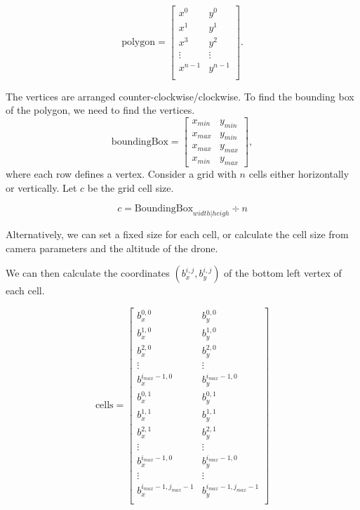 \begin{figure}
	
	\label{fig:viewpoint-generation}
\end{figure}

$$
\text{polygon} = \begin{bmatrix}
x^0 & y^0 \\
x^1 & y^1 \\
x^3 & y^2 \\
\vdots  & \vdots \\
x^{n-1} & y^{n-1} \\
\end{bmatrix}. 
$$

The vertices are arranged counter-clockwise/clockwise. To find the bounding box of the polygon, we need to find the vertices.
$$
\text{boundingBox} = \begin{bmatrix}
x_{min} & y_{min} \\
x_{max} & y_{min} \\
x_{max} & y_{max} \\
x_{min} & y_{max}
\end{bmatrix},
$$
where each row defines a vertex. Consider a grid with $n$ cells either horizontally or vertically. Let $c$ be the grid cell size.

$$c = \text{BoundingBox}_{width|heigh} \div  n $$

Alternatively, we can set a fixed size for each cell, or calculate the cell size from camera parameters and the altitude of the drone.

We can then calculate the coordinates $(b^{i,j}_x, b^{i,j}_y)$ of the bottom left vertex of each cell.

$$\text{cells} =\begin{bmatrix}
b^{0,0}_x & b^{0,0}_y \\
b^{1,0}_x & b^{1,0}_y \\
b^{2,0}_x & b^{2,0}_y \\
\vdots & \vdots \\
b^{i_{max} - 1,0}_x & b^{i_{max} - 1,0}_y \\
b^{0,1}_x & b^{0,1}_y \\
b^{1,1}_x & b^{1,1}_y \\
b^{2,1}_x & b^{2,1}_y \\
\vdots & \vdots \\
b^{i_{max} - 1,0}_x & b^{i_{max} - 1,0}_y \\
\vdots & \vdots \\
b^{i_{max} - 1,j_{max}-1}_x & b^{i_{max} - 1,j_{max} - 1}_y \\
\end{bmatrix}$$

